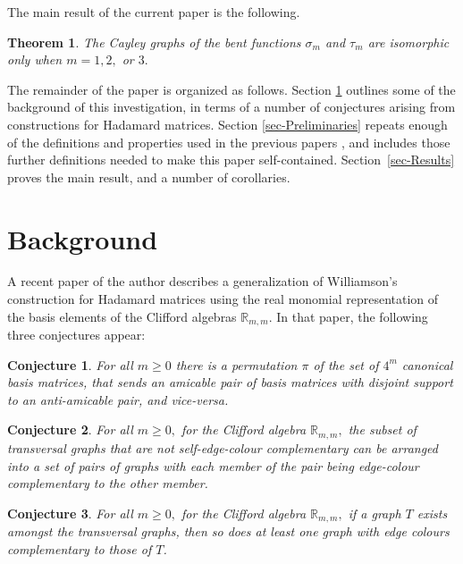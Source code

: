 \documentclass[12pt,a4paper]{article}
\newcommand{\mb}[1]{\mathbb{#1}}
\newcommand{\R}{\mb{R}}
\newtheorem{Theorem}{Theorem}
\newtheorem{Conjecture}{Conjecture}
\begin{document}
The main result of the current paper is the following.
\begin{Theorem}\label{HR-non-imomorphic-theorem}
The Cayley graphs of the bent functions $\sigma_m$ and $\tau_m$ are isomorphic only when $m=1, 2,$ or $3.$ 
\end{Theorem}

The remainder of the paper is organized as follows.
Section \ref{sec-Background} outlines some of the background of this investigation, in terms of a number of conjectures arising from constructions for  Hada\-mard matrices.
Section \ref{sec-Preliminaries} repeats enough of the definitions and properties used in the previous papers \cite{Leo14Constructions, Leo15Bent},
and includes those further definitions needed to make this paper self-contained.
Section~\ref{sec-Results} proves the main result, and a number of corollaries.

\section{Background}\label{sec-Background}
A recent paper of the author \cite{Leo14Constructions} describes a generalization of
Williamson's construction for Hada\-mard matrices \cite{Wil44}
using the real monomial representation of the basis elements of the Clifford algebras $\R_{m,m}$.
In that paper, the following three conjectures appear:

\begin{Conjecture}\label{conjecture-1}
%
For all $m \geqslant 0$ there is a permutation $\pi$ of the set of $4^m$ canonical basis matrices,
that sends an amicable pair of basis matrices with disjoint support to an anti-amicable pair, and vice-versa.
%
\end{Conjecture}

\begin{Conjecture}\label{conjecture-2}
%
For all $m \geqslant 0,$ 
for the Clifford algebra $\R_{m,m},$ the subset of transversal graphs that are 
not self-edge-colour complementary
can be arranged into a set of pairs of graphs with each member of the pair 
being edge-colour complementary to the other member.
%
\end{Conjecture}

\begin{Conjecture}\label{conjecture-3}
%
For all $m \geqslant 0,$ 
for the Clifford algebra $\R_{m,m},$ if a graph $T$ exists amongst the transversal graphs,
then so does at least one graph with edge colours complementary to those of $T$.
%
\end{Conjecture}
\end{document}
